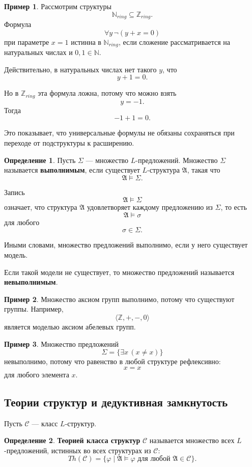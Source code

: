 \documentclass[12pt,a4paper,oneside,openany]{book}
\theoremstyle{definition}
\newtheorem{definition}{Определение}[chapter]
\newtheorem{example}{Пример}[chapter]
\theoremstyle{plain}
\theoremstyle{remark}
\begin{document}
\begin{example}
Рассмотрим структуры
\[
\mathbb N_{ring}
\subseteq
\mathbb Z_{ring}.
\]
Формула
\[
\forall y\,\neg(y+x=0)
\]
при параметре $x=1$ истинна в $\mathbb N_{ring}$, если сложение рассматривается на натуральных числах и $0,1\in\mathbb N$.

Действительно, в натуральных числах нет такого $y$, что
\[
y+1=0.
\]

Но в $\mathbb Z_{ring}$ эта формула ложна, потому что можно взять
\[
y=-1.
\]
Тогда
\[
-1+1=0.
\]

Это показывает, что универсальные формулы не обязаны сохраняться при переходе от подструктуры к расширению.
\end{example}


\begin{definition}
Пусть $\Sigma$ — множество $L$-предложений. Множество $\Sigma$ называется \textbf{выполнимым}, если существует $L$-структура $\mathfrak A$, такая что
\[
\mathfrak A\models\Sigma.
\]
\end{definition}

Запись
\[
\mathfrak A\models\Sigma
\]
означает, что структура $\mathfrak A$ удовлетворяет каждому предложению из $\Sigma$, то есть
\[
\mathfrak A\models\sigma
\]
для любого
\[
\sigma\in\Sigma.
\]

Иными словами, множество предложений выполнимо, если у него существует модель.

Если такой модели не существует, то множество предложений называется \textbf{невыполнимым}.

\begin{example}
Множество аксиом групп выполнимо, потому что существуют группы. Например,
\[
\langle\mathbb Z,+,-,0\rangle
\]
является моделью аксиом абелевых групп.
\end{example}

\begin{example}
Множество предложений
\[
\Sigma=\{\exists x\,(x\ne x)\}
\]
невыполнимо, потому что равенство в любой структуре рефлексивно:
\[
x=x
\]
для любого элемента $x$.
\end{example}


\subsection{Теории структур и дедуктивная замкнутость}

Пусть $\mathcal C$ — класс $L$-структур.

\begin{definition}
\textbf{Теорией класса структур} $\mathcal C$ называется множество всех $L$-предложений, истинных во всех структурах из $\mathcal C$:
\[
Th(\mathcal C)
=
\{\varphi\mid \mathfrak A\models\varphi
\text{ для любой } \mathfrak A\in\mathcal C\}.
\]
\end{definition}
\end{document}
